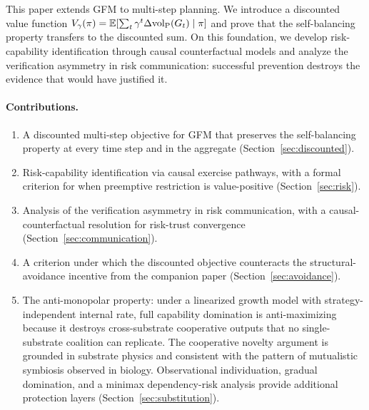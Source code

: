 This paper extends GFM to multi-step planning. We introduce a discounted
value function $V_\gamma(\pi) = \mathbb{E}[\sum_t \gamma^t \Delta {\operatorname{vol}_{\mathrm{P}}}(G_t)
\mid \pi]$ and prove that the self-balancing property transfers to the
discounted sum. On this foundation, we develop risk-capability identification
through causal counterfactual models and analyze the verification asymmetry
in risk communication: successful prevention destroys the evidence that would
have justified it.

\paragraph{Contributions.}
\begin{enumerate}
\item A discounted multi-step objective for GFM that preserves the
  self-balancing property at every time step and in the aggregate
  (Section~\ref{sec:discounted}).
\item Risk-capability identification via causal exercise pathways, with
  a formal criterion for when preemptive restriction is value-positive
  (Section~\ref{sec:risk}).
\item Analysis of the verification asymmetry in risk communication, with
  a causal-counterfactual resolution for risk-trust convergence
  (Section~\ref{sec:communication}).
\item A criterion under which the discounted objective counteracts the
  structural-avoidance incentive from the companion paper
  (Section~\ref{sec:avoidance}).
\item The anti-monopolar property: under a linearized growth model with
  strategy-independent internal rate, full capability domination is
  anti-maximizing because it destroys cross-substrate cooperative outputs
  that no single-substrate coalition can replicate. The cooperative novelty
  argument is grounded in substrate physics and consistent with the pattern
  of mutualistic symbiosis observed in biology. Observational individuation, gradual
  domination, and a minimax dependency-risk analysis provide additional
  protection layers (Section~\ref{sec:substitution}).
\end{enumerate}
